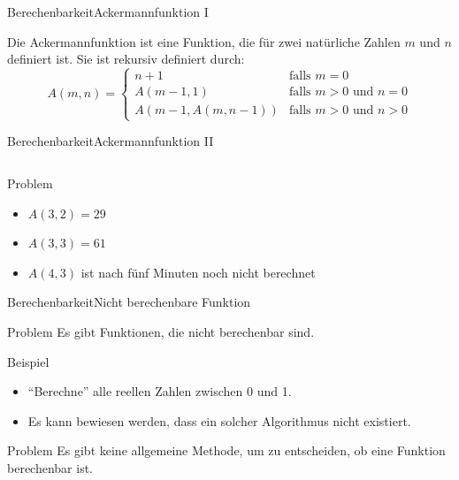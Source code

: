 \documentclass[xelatex,aspectratio=169]{beamer}
\begin{document}
\begin{frame}{Berechenbarkeit}{Ackermannfunktion I}

  \begin{definition}
    Die Ackermannfunktion ist eine Funktion, die für zwei natürliche Zahlen $m$ und $n$ definiert ist. Sie ist rekursiv definiert durch:
    \[
      A\left(m, n\right) = \begin{cases}
        n + 1                                   & \mbox{falls } m = 0                    \\
        A\left(m-1, 1\right)                    & \mbox{falls } m > 0 \mbox{ und } n = 0 \\
        A\left(m-1, A\left(m, n-1\right)\right) & \mbox{falls } m > 0 \mbox{ und } n > 0
      \end{cases}
    \]
  \end{definition}

\end{frame}
\begin{frame}{Berechenbarkeit}{Ackermannfunktion II}

  \inputminted[firstline=8,lastline=16]{python}{src/algorithmus_ackermann.py}

  \begin{alertblock}{Problem}

    \begin{itemize}
      \item $A\left(3, 2\right) = 29$
      \item $A\left(3, 3\right) = 61$
      \item $A\left(4, 3\right)$ ist nach fünf Minuten noch nicht berechnet
    \end{itemize}

  \end{alertblock}
\end{frame}

\begin{frame}{Berechenbarkeit}{Nicht berechenbare Funktion}
  \begin{block}{Problem}
    Es gibt Funktionen, die nicht berechenbar sind.
  \end{block}

  \begin{exampleblock}{Beispiel}
    \begin{itemize}
      \item \enquote{Berechne} alle reellen Zahlen zwischen 0 und 1.
      \item Es kann bewiesen werden, dass ein solcher Algorithmus nicht existiert.
    \end{itemize}
  \end{exampleblock}

  \begin{alertblock}{Problem}
    Es gibt keine allgemeine Methode, um zu entscheiden, ob eine Funktion berechenbar ist.
  \end{alertblock}

\end{frame}
\end{document}
